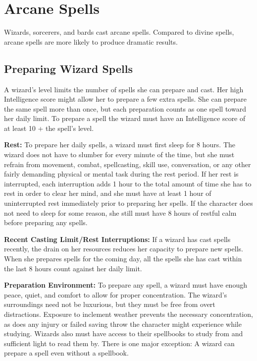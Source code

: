 \section{Arcane Spells}

Wizards, sorcerers, and bards cast arcane spells. Compared to divine spells, arcane 
spells are more likely to produce dramatic results.

\subsection{Preparing Wizard Spells}

A wizard's level limits the number of spells she can prepare and cast. Her high 
Intelligence score might allow her to prepare a few extra spells. She can prepare 
the same spell more than once, but each preparation counts as one spell toward 
her daily limit. To prepare a spell the wizard must have an Intelligence score 
of at least 10 + the spell's level.

\textbf{Rest:} To prepare her daily spells, a wizard must first sleep for 8 hours. 
The wizard does not have to slumber for every minute of the time, but she must 
refrain from movement, combat, spellcasting, skill use, conversation, or any other 
fairly demanding physical or mental task during the rest period. If her rest is 
interrupted, each interruption adds 1 hour to the total amount of time she has 
to rest in order to clear her mind, and she must have at least 1 hour of uninterrupted 
rest immediately prior to preparing her spells. If the character does not need 
to sleep for some reason, she still must have 8 hours of restful calm before preparing 
any spells. 

\textbf{Recent Casting Limit/Rest Interruptions:} If a wizard has cast spells recently, 
the drain on her resources reduces her capacity to prepare new spells. When she 
prepares spells for the coming day, all the spells she has cast within the last 
8 hours count against her daily limit.

\textbf{Preparation Environment:} To prepare any spell, a wizard must have enough 
peace, quiet, and comfort to allow for proper concentration. The wizard's surroundings 
need not be luxurious, but they must be free from overt distractions. Exposure 
to inclement weather prevents the necessary concentration, as does any injury or 
failed saving throw the character might experience while studying. Wizards also 
must have access to their spellbooks to study from and sufficient light to read 
them by. There is one major exception: A wizard can prepare a  
spell even without a spellbook. 

